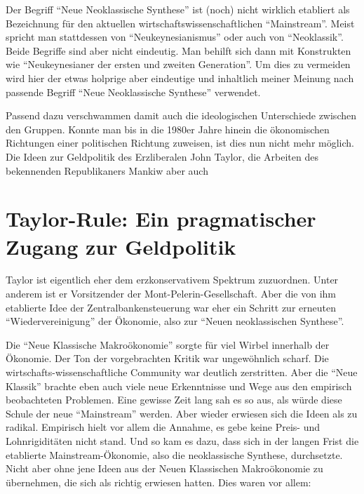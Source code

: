 Der Begriff "`Neue Neoklassische Synthese"' ist (noch) nicht wirklich etabliert als Bezeichnung für den aktuellen wirtschaftswissenschaftlichen "`Mainstream"'. Meist spricht man stattdessen von "`Neukeynesianismus"' oder auch von "`Neoklassik"'. Beide Begriffe sind aber nicht eindeutig. Man behilft sich dann mit Konstrukten wie "`Neukeynesianer der ersten und zweiten Generation"'. Um dies zu vermeiden wird hier der etwas holprige aber eindeutige und inhaltlich meiner Meinung nach passende Begriff "`Neue Neoklassische Synthese"' verwendet.

Passend dazu verschwammen damit auch die ideologischen Unterschiede zwischen den Gruppen. Konnte man bis in die 1980er Jahre hinein die ökonomischen Richtungen einer politischen Richtung zuweisen, ist dies nun nicht mehr möglich.
Die Ideen zur Geldpolitik des Erzliberalen John Taylor, die Arbeiten des bekennenden Republikaners Mankiw aber auch 









\section{Taylor-Rule: Ein pragmatischer Zugang zur Geldpolitik}
Taylor ist eigentlich eher dem erzkonservativem Spektrum zuzuordnen. Unter anderem ist er Vorsitzender der Mont-Pelerin-Gesellschaft. Aber die von ihm etablierte Idee der Zentralbankensteuerung war eher ein Schritt zur erneuten "`Wiedervereinigung"' der Ökonomie, also zur "`Neuen neoklassischen Synthese"'.

Die "`Neue Klassische Makroökonomie"' sorgte für viel Wirbel innerhalb der Ökonomie. Der Ton der vorgebrachten Kritik war ungewöhnlich scharf. Die wirtschafts-wissenschaftliche Community war deutlich zerstritten. Aber die "`Neue Klassik"' brachte eben auch viele neue Erkenntnisse und Wege aus den empirisch beobachteten Problemen. Eine gewisse Zeit lang sah es so aus, als würde diese Schule der neue "`Mainstream"' werden. Aber wieder erwiesen sich die Ideen als zu radikal. Empirisch hielt vor allem die Annahme, es gebe keine Preis- und Lohnrigiditäten nicht stand.
Und so kam es dazu, dass sich in der langen Frist die etablierte Mainstream-Ökonomie, also die neoklassische Synthese, durchsetzte. Nicht aber ohne jene Ideen aus der Neuen Klassischen Makroökonomie zu übernehmen, die sich als richtig erwiesen hatten. Dies waren vor allem:

